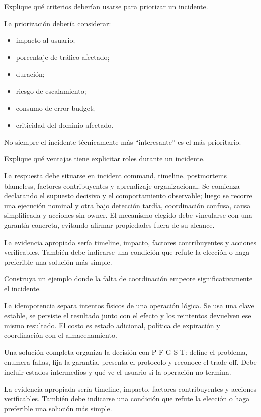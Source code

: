 \documentclass[variant=guia,cover=institutional,mode=screen]{ua-engineering-v6-article}
\begin{document}
\begin{uaexercise}
Explique qué criterios deberían usarse para priorizar un incidente.
\end{uaexercise}
\begin{uaanswer}
La priorización debería considerar:
\begin{itemize}
\item impacto al usuario;
\item porcentaje de tráfico afectado;
\item duración;
\item riesgo de escalamiento;
\item consumo de error budget;
\item criticidad del dominio afectado.
\end{itemize}

No siempre el incidente técnicamente más “interesante” es el más prioritario.
\end{uaanswer}

\begin{uaexercise}
Explique qué ventajas tiene explicitar roles durante un incidente.
\end{uaexercise}
\begin{uaanswer}
La respuesta debe situarse en incident command, timeline, postmortems blameless, factores contribuyentes y aprendizaje organizacional. Se comienza declarando el supuesto decisivo y el comportamiento observable; luego se recorre una ejecución nominal y otra bajo detección tardía, coordinación confusa, causa simplificada y acciones sin owner. El mecanismo elegido debe vincularse con una garantía concreta, evitando afirmar propiedades fuera de su alcance.

La evidencia apropiada sería timeline, impacto, factores contribuyentes y acciones verificables. También debe indicarse una condición que refute la elección o haga preferible una solución más simple.
\end{uaanswer}

\begin{uaexercise}
Construya un ejemplo donde la falta de coordinación empeore significativamente el incidente.
\end{uaexercise}
\begin{uaanswer}
La idempotencia separa intentos físicos de una operación lógica. Se usa una clave estable, se persiste el resultado junto con el efecto y los reintentos devuelven ese mismo resultado. El costo es estado adicional, política de expiración y coordinación con el almacenamiento.

Una solución completa organiza la decisión con P-F-G-S-T: define el problema, enumera fallas, fija la garantía, presenta el protocolo y reconoce el trade-off. Debe incluir estados intermedios y qué ve el usuario si la operación no termina.

La evidencia apropiada sería timeline, impacto, factores contribuyentes y acciones verificables. También debe indicarse una condición que refute la elección o haga preferible una solución más simple.
\end{uaanswer}
\end{document}
